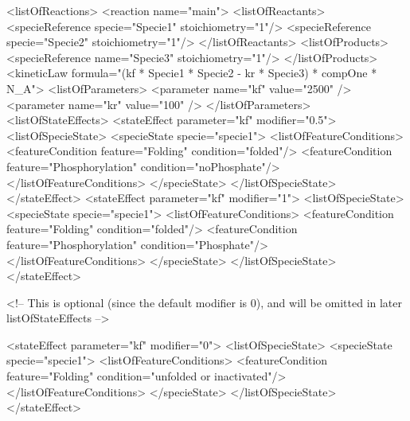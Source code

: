 \documentclass{cekarticle}
\newenvironment{changemargin}[2]{\begin{list}{}{%
\setlength{\leftmargin}{0pt}%
\setlength{\rightmargin}{0pt}%
\setlength{\listparindent}{\parindent}%
\setlength{\itemindent}{\parindent}%
\addtolength{\leftmargin}{#1}%
\addtolength{\rightmargin}{#2}%
}\item }{\end{list}}
\begin{document}
\begin{changemargin}{-2cm}{0cm}
\begin{example}
            <listOfReactions>
                <reaction  name="main">
                    <listOfReactants>
                        <specieReference specie="Specie1" stoichiometry="1"/>
                        <specieReference specie="Specie2" stoichiometry="1"/>
                    </listOfReactants>
                    <listOfProducts>
                        <specieReference name="Specie3" stoichiometry="1"/>
                    </listOfProducts>
                    <kineticLaw formula="(kf * Specie1 * Specie2 - kr * Specie3) * compOne * N_A">
                        <listOfParameters>
                            <parameter name="kf" value="2500" />
                            <parameter name="kr" value="100" />
                        </listOfParameters>
                        <listOfStateEffects>
                            <stateEffect parameter="kf" modifier="0.5">
                                <listOfSpecieState>
                                    <specieState specie="specie1">
                                        <listOfFeatureConditions>
                                            <featureCondition feature="Folding" condition="folded"/>
                                            <featureCondition feature="Phosphorylation" condition="noPhosphate"/>
                                        </listOfFeatureConditions>
                                    </specieState>
                                </listOfSpecieState>
                            </stateEffect>  
                            <stateEffect parameter="kf" modifier="1">
                                <listOfSpecieState>
                                    <specieState specie="specie1">
                                        <listOfFeatureConditions>
                                            <featureCondition feature="Folding" condition="folded"/>
                                            <featureCondition feature="Phosphorylation" condition="Phosphate"/>
                                        </listOfFeatureConditions>
                                    </specieState>
                                </listOfSpecieState>
                            </stateEffect>  

<!-- This is optional (since the default modifier is 0), and will be omitted in later listOfStateEffects -->

                            <stateEffect parameter="kf" modifier="0">
                                 <listOfSpecieState>
                                    <specieState specie="specie1">
                                        <listOfFeatureConditions>
                                            <featureCondition feature="Folding" condition="unfolded or inactivated"/>
                                        </listOfFeatureConditions>
                                    </specieState>
                                </listOfSpecieState>
                            </stateEffect>


\end{example}
\end{changemargin}
\end{document}

